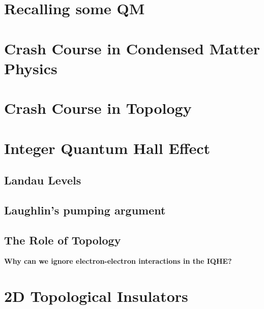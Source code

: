 \documentclass[11pt]{article}
\begin{document}
\section{Recalling some QM}

\newpage
\section{Crash Course in Condensed Matter Physics}

\newpage
\section{Crash Course in Topology}

\newpage
\section{Integer Quantum Hall Effect}

\subsection{Landau Levels}

\subsection{Laughlin's pumping argument}

\subsection{The Role of Topology}

\begin{redbox}
    \textbf{Why can we ignore electron-electron interactions in the IQHE?}
\end{redbox}

\newpage
\section{2D Topological Insulators}
\end{document}
